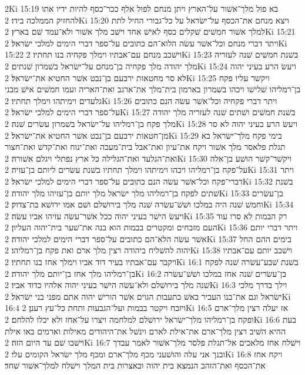 2Ki 15:19  בא פול מלך־אשׁור על־הארץ ויתן מנחם לפול אלף ככר־כסף להיות ידיו אתו להחזיק הממלכה בידו׃
2Ki 15:20  ויצא מנחם את־הכסף על־ישׂראל על כל־גבורי החיל לתת למלך אשׁור חמשׁים שׁקלים כסף לאישׁ אחד וישׁב מלך אשׁור ולא־עמד שׁם בארץ׃
2Ki 15:21  ויתר דברי מנחם וכל־אשׁר עשׂה הלוא־הם כתובים על־ספר דברי הימים למלכי ישׂראל׃
2Ki 15:22  וישׁכב מנחם עם־אבתיו וימלך פקחיה בנו תחתיו׃
2Ki 15:23  בשׁנת חמשׁים שׁנה לעזריה מלך יהודה מלך פקחיה בן־מנחם על־ישׂראל בשׁמרון שׁנתים׃
2Ki 15:24  ויעשׂ הרע בעיני יהוה לא סר מחטאות ירבעם בן־נבט אשׁר החטיא את־ישׂראל׃
2Ki 15:25  ויקשׁר עליו פקח בן־רמליהו שׁלישׁו ויכהו בשׁמרון בארמון בית־מלך את־ארגב ואת־האריה ועמו חמשׁים אישׁ מבני גלעדים וימיתהו וימלך תחתיו׃
2Ki 15:26  ויתר דברי פקחיה וכל־אשׁר עשׂה הנם כתובים על־ספר דברי הימים למלכי ישׂראל׃
2Ki 15:27  בשׁנת חמשׁים ושׁתים שׁנה לעזריה מלך יהודה מלך פקח בן־רמליהו על־ישׂראל בשׁמרון עשׂרים שׁנה׃
2Ki 15:28  ויעשׂ הרע בעיני יהוה לא סר מן־חטאות ירבעם בן־נבט אשׁר החטיא את־ישׂראל׃
2Ki 15:29  בימי פקח מלך־ישׂראל בא תגלת פלאסר מלך אשׁור ויקח את־עיון ואת־אבל בית־מעכה ואת־ינוח ואת־קדשׁ ואת־חצור ואת־הגלעד ואת־הגלילה כל ארץ נפתלי ויגלם אשׁורה׃
2Ki 15:30  ויקשׁר־קשׁר הושׁע בן־אלה על־פקח בן־רמליהו ויכהו וימיתהו וימלך תחתיו בשׁנת עשׂרים ליותם בן־עזיה׃
2Ki 15:31  ויתר דברי־פקח וכל־אשׁר עשׂה הנם כתובים על־ספר דברי הימים למלכי ישׂראל׃
2Ki 15:32  בשׁנת שׁתים לפקח בן־רמליהו מלך ישׂראל מלך יותם בן־עזיהו מלך יהודה׃
2Ki 15:33  בן־עשׂרים וחמשׁ שׁנה היה במלכו ושׁשׁ־עשׂרה שׁנה מלך בירושׁלם ושׁם אמו ירושׁא בת־צדוק׃
2Ki 15:34  ויעשׂ הישׁר בעיני יהוה ככל אשׁר־עשׂה עזיהו אביו עשׂה׃
2Ki 15:35  רק הבמות לא סרו עוד העם מזבחים ומקטרים בבמות הוא בנה את־שׁער בית־יהוה העליון׃
2Ki 15:36  ויתר דברי יותם אשׁר עשׂה הלא־הם כתובים על־ספר דברי הימים למלכי יהודה׃
2Ki 15:37  בימים ההם החל יהוה להשׁליח ביהודה רצין מלך ארם ואת פקח בן־רמליהו׃
2Ki 15:38  וישׁכב יותם עם־אבתיו ויקבר עם־אבתיו בעיר דוד אביו וימלך אחז בנו תחתיו׃
2Ki 16:1  בשׁנת שׁבע־עשׂרה שׁנה לפקח בן־רמליהו מלך אחז בן־יותם מלך יהודה׃
2Ki 16:2  בן־עשׂרים שׁנה אחז במלכו ושׁשׁ־עשׂרה שׁנה מלך בירושׁלם ולא־עשׂה הישׁר בעיני יהוה אלהיו כדוד אביו׃
2Ki 16:3  וילך בדרך מלכי ישׂראל וגם את־בנו העביר באשׁ כתעבות הגוים אשׁר הורישׁ יהוה אתם מפני בני ישׂראל׃
2Ki 16:4  ויזבח ויקטר בבמות ועל־הגבעות ותחת כל־עץ רענן׃
2Ki 16:5  אז יעלה רצין מלך־ארם ופקח בן־רמליהו מלך־ישׂראל ירושׁלם למלחמה ויצרו על־אחז ולא יכלו להלחם׃
2Ki 16:6  בעת ההיא השׁיב רצין מלך־ארם את־אילת לארם וינשׁל את־היהודים מאילות וארמים באו אילת וישׁבו שׁם עד היום הזה׃
2Ki 16:7  וישׁלח אחז מלאכים אל־תגלת פלסר מלך־אשׁור לאמר עבדך ובנך אני עלה והושׁעני מכף מלך־ארם ומכף מלך ישׂראל הקומים עלי׃
2Ki 16:8  ויקח אחז את־הכסף ואת־הזהב הנמצא בית יהוה ובאצרות בית המלך וישׁלח למלך־אשׁור שׁחד׃
